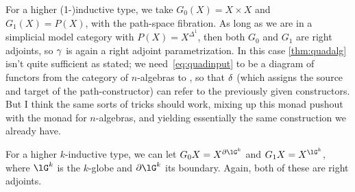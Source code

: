\documentclass{amsart}
\begin{document}
\begin{eg}
  For a higher (1-)inductive type, we take $G_0(X)=X\times X$ and $G_1(X)=P(X)$, with \gm the path-space fibration.
  As long as we are in a simplicial model category with $P(X) = X^{\Delta^1}$, then both $G_0$ and $G_1$ are right adjoints, so $\gamma$ is again a right adjoint parametrization.
  In this case \autoref{thm:quadalg} isn't quite sufficient as stated; we need~\eqref{eq:quadinput} to be a diagram of functors from the category of $n$-algebras to \sC, so that $\delta$ (which assigns the source and target of the path-constructor) can refer to the previously given constructors.
  But I think the same sorts of tricks should work, mixing up this monad pushout with the monad for $n$-algebras, and yielding essentially the same construction we already have.

  For a higher $k$-inductive type, we can let $G_0X = X^{\partial\lG^k}$  and $G_1 X = X^{\lG^k}$, where $\lG^k$ is the $k$-globe and $\partial\lG^k$ its boundary.
  Again, both of these are right adjoints.
\end{eg}
\end{document}
